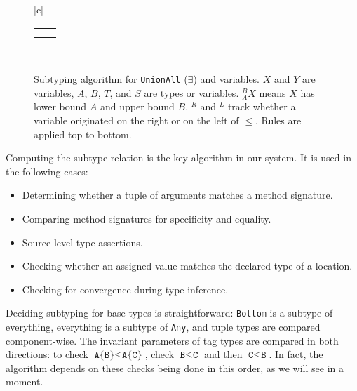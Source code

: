 \begin{figure}[!t]
\begin{center}
\begin{tabular}{|c|}
\begin{tabular}{cc}
        \hspace{4ex}

        &

        \AxiomC{$_A^BX^R,\Gamma\ \vdash\ A \leq T$}
        \UnaryInfC{$_A^TX^R,\Gamma\ \vdash\ X \leq T$}
        \DisplayProof

        \\[8pt]

        \AxiomC{$_AX^L,\Gamma\ \vdash\ T \leq A$}
        \UnaryInfC{$_AX^L,\Gamma\ \vdash\ T \leq X$}
        \DisplayProof

        \hspace{3ex}

        &

        \AxiomC{$^BX^L,\Gamma\ \vdash\ B \leq T$}
        \UnaryInfC{$^BX^L,\Gamma\ \vdash\ X \leq T$}
        \DisplayProof

        \\[8pt]
      \end{tabular}
      \\
      \hline
    \end{tabular}
  \end{center}
  \caption[Subtyping algorithm]{
\small{
    Subtyping algorithm for \texttt{UnionAll} ($\exists$) and variables.
    $X$ and $Y$ are variables, $A$, $B$, $T$, and $S$ are types or variables.
    $_A^BX$ means $X$ has lower bound $A$ and upper bound $B$.
    $^R$ and $^L$ track whether a variable originated on the right or on the left of
    $\leq$.
    Rules are applied top to bottom.
}
  }
  \label{subtvars}
\end{figure}

Computing the subtype relation is the key algorithm in our system.
It is used in the following cases:

\begin{itemize}
\item Determining whether a tuple of arguments matches a method signature.
\item Comparing method signatures for specificity and equality.
\item Source-level type assertions.
\item Checking whether an assigned value matches the declared type of a
location.
\item Checking for convergence during type inference.
\end{itemize}

Deciding subtyping for base types is straightforward: \texttt{Bottom} is
a subtype of everything, everything is a subtype of \texttt{Any}, and
tuple types are compared component-wise.
The invariant parameters of tag types are compared in both directions: to check
$\texttt{A\{B\}}\leq \texttt{A\{C\}}$, check $\texttt{B}\leq\texttt{C}$ and
then $\texttt{C}\leq\texttt{B}$.
In fact, the algorithm depends on these checks being done in this order, as we
will see in a moment.

